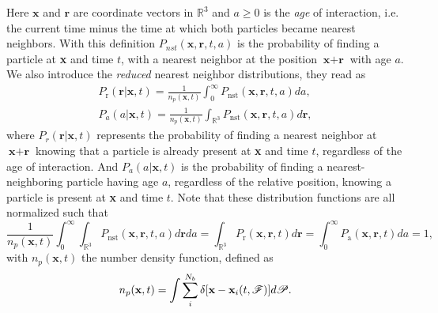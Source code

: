Here $\textbf{x}$ and $\textbf{r}$ are coordinate vectors in $\mathbb{R}^3$ and $a \geq 0 $ is the \textit{age} of interaction, i.e. the current time minus the time at which both particles became nearest neighbors.   
With this definition $P_{nst}(\textbf{x},\textbf{r},t,a)$ is the probability of finding a particle at \textbf{x} and time $t$, with a nearest neighbor at the position $\textbf{x}+\textbf{r}$ with age $a$.
We also introduce the \textit{reduced} nearest neighbor distributions, they read as
\begin{align}
    P_\text{r}(\textbf{r}|\textbf{x},t)
    =\frac{1}{n_p(\textbf{x},t)}\int_0^\infty P_\text{nst}(\textbf{x},\textbf{r},t,a) da,\\
    P_a(a|\textbf{x},t)
    = \frac{1}{n_p(\textbf{x},t)}\int_{\mathbb{R}^3} P_\text{nst}(\textbf{x},\textbf{r},t,a) d\textbf{r},
\end{align}
where $P_r(\textbf{r}|\textbf{x},t)$ represents the probability of finding a nearest neighbor at $\textbf{x}+\textbf{r}$ knowing that a particle is already present at \textbf{x} and time $t$, regardless of the age of interaction. 
And $P_a(a|\textbf{x},t)$ is the probability of finding a nearest-neighboring particle having age $a$, regardless of the relative position, knowing a particle is present at \textbf{x} and time $t$. 
Note that these distribution functions are all normalized such that 
\begin{equation}
    \frac{1}{n_p(\textbf{x},t)}\int_0^\infty \int_{\mathbb{R}^3} P_\text{nst}(\textbf{x},\textbf{r},t,a) d\textbf{r} da 
    = 
    \int_{\mathbb{R}^3} P_\text{r}(\textbf{x},\textbf{r},t) d\textbf{r} 
    = \int_0^\infty P_\text{a}(\textbf{x},\textbf{r},t) da 
    = 1,
    \label{eq:norm}
\end{equation}
with $n_p(\textbf{x},t)$ the number density function, defined as
\begin{equation}
    n_p(\textbf{x},t)= 
    \int \sum_{i}^{N_b}\delta[\textbf{x}-\textbf{x}_i(t,\FF)] d\mathscr{P}.
    \label{eq:n_p}
\end{equation}



